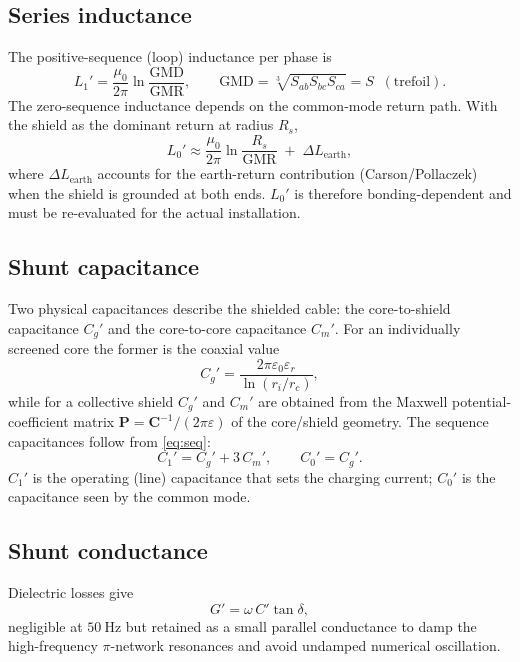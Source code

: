 \documentclass[11pt,a4paper]{article}
\newcommand{\Cmat}{\bm{C}}
\begin{document}
\subsection{Series inductance}
The positive-sequence (loop) inductance per phase is
\begin{equation}
L_1'=\frac{\mu_0}{2\pi}\ln\!\frac{\mathrm{GMD}}{\mathrm{GMR}},
\qquad \mathrm{GMD}=\sqrt[3]{S_{ab}S_{bc}S_{ca}}=S \;\;(\text{trefoil}).
\label{eq:l1}
\end{equation}
The zero-sequence inductance depends on the common-mode return path. With the
shield as the dominant return at radius $R_s$,
\begin{equation}
L_0'\approx\frac{\mu_0}{2\pi}\ln\!\frac{R_s}{\mathrm{GMR}}
\;+\;\Delta L_{\mathrm{earth}},
\label{eq:l0}
\end{equation}
where $\Delta L_{\mathrm{earth}}$ accounts for the earth-return contribution
(Carson/Pollaczek) when the shield is grounded at both ends. $L_0'$ is therefore
bonding-dependent and must be re-evaluated for the actual installation.

\subsection{Shunt capacitance}
Two physical capacitances describe the shielded cable: the core-to-shield
capacitance $C_g'$ and the core-to-core capacitance $C_m'$. For an individually
screened core the former is the coaxial value
\begin{equation}
C_g'=\frac{2\pi\varepsilon_0\varepsilon_r}{\ln(r_i/r_c)} ,
\label{eq:cg}
\end{equation}
while for a collective shield $C_g'$ and $C_m'$ are obtained from the Maxwell
potential-coefficient matrix $\bm{P}=\Cmat^{-1}/(2\pi\varepsilon)$ of the
core/shield geometry. The sequence capacitances follow from \eqref{eq:seq}:
\begin{equation}
C_1'=C_g'+3\,C_m', \qquad C_0'=C_g'.
\label{eq:cseq}
\end{equation}
$C_1'$ is the operating (line) capacitance that sets the charging current; $C_0'$
is the capacitance seen by the common mode.

\subsection{Shunt conductance}
Dielectric losses give
\begin{equation}
G'=\omega\,C'\tan\delta,
\label{eq:g}
\end{equation}
negligible at $50\ \mathrm{Hz}$ but retained as a small parallel conductance to
damp the high-frequency $\pi$-network resonances and avoid undamped numerical
oscillation.
\end{document}
